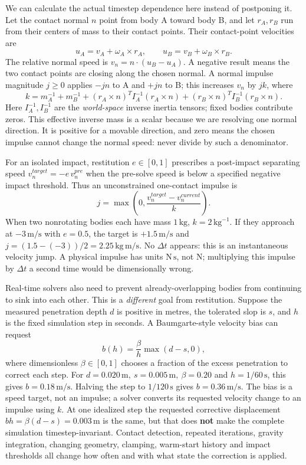 \hypertarget{06-engine-ii-ch038-first-use-completion-restitution-penetration-correction-and-the-timestep-are-different-mechanisms}{}

We can calculate the actual timestep dependence here instead of postponing it. Let the contact normal \(n\) point from body A toward body B, and let \(r_A,r_B\) run from their centers of mass to their contact points. Their contact-point velocities are \[
u_A=v_A+\omega_A\times r_A,\qquad
u_B=v_B+\omega_B\times r_B.
\] The relative normal speed is \(v_n=n\cdot(u_B-u_A)\). A negative result means the two contact points are closing along the chosen normal. A normal impulse magnitude \(j\geq0\) applies \(-jn\) to A and \(+jn\) to B; this increases \(v_n\) by \(jk\), where \[
k=m_A^{-1}+m_B^{-1}
 +(r_A\times n)^TI_A^{-1}(r_A\times n)
 +(r_B\times n)^TI_B^{-1}(r_B\times n).
\] Here \(I_A^{-1},I_B^{-1}\) are the \emph{world-space} inverse inertia tensors; fixed bodies contribute zeros. This effective inverse mass is a scalar because we are resolving one normal direction. It is positive for a movable direction, and zero means the chosen impulse cannot change the normal speed: never divide by such a denominator.

For an isolated impact, restitution \(e\in[0,1]\) prescribes a post-impact separating speed \(v_n^{target}=-e\,v_n^{pre}\) when the pre-solve speed is below a specified negative impact threshold. Thus an unconstrained one-contact impulse is \[
j=\max\!\left(0,\frac{v_n^{target}-v_n^{current}}{k}\right).
\] When two nonrotating bodies each have mass \(1\,\mathrm{kg}\), \(k=2\,\mathrm{kg}^{-1}\). If they approach at \(-3\,\mathrm{m/s}\) with \(e=0.5\), the target is \(+1.5\,\mathrm{m/s}\) and \(j=(1.5-(-3))/2=2.25\,\mathrm{kg\,m/s}\). No \(\Delta t\) appears: this is an instantaneous velocity jump. A physical impulse has units \(\mathrm{N\,s}\), not \(\mathrm N\); multiplying this impulse by \(\Delta t\) a second time would be dimensionally wrong.

Real-time solvers also need to prevent already-overlapping bodies from continuing to sink into each other. This is a \emph{different} goal from restitution. Suppose the measured penetration depth \(d\) is positive in metres, the tolerated slop is \(s\), and \(h\) is the fixed simulation step in seconds. A Baumgarte-style velocity bias can request \[
b(h)=\frac{\beta}{h}\max(d-s,0),
\] where dimensionless \(\beta\in[0,1]\) chooses a fraction of the excess penetration to correct each step. For \(d=0.020\,\mathrm m,\ s=0.005\,\mathrm m,\ \beta=0.20\) and \(h=1/60\,\mathrm s\), this gives \(b=0.18\,\mathrm{m/s}\). Halving the step to \(1/120\,\mathrm s\) gives \(b=0.36\,\mathrm{m/s}\). The bias is a speed target, not an impulse; a solver converts its requested velocity change to an impulse using \(k\). At one idealized step the requested corrective displacement \(bh=\beta(d-s)=0.003\,\mathrm m\) is the same, but that does \textbf{not} make the complete simulation timestep-invariant. Contact detection, repeated iterations, gravity integration, changing geometry, clamping, warm-start history and impact thresholds all change how often and with what state the correction is applied.


